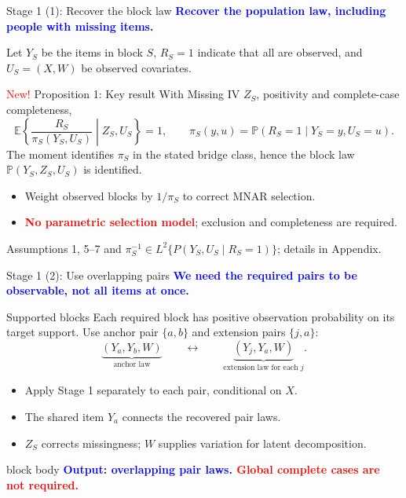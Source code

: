 \documentclass[aspectratio=169,10pt]{beamer}
\newcommand{\slideannotation}{\fontsize{8pt}{9.6pt}\selectfont}
\newcommand{\E}{\mathbb E}
\newcommand{\Prb}{\mathbb P}
\newcommand{\bluekey}[1]{\textcolor{Blue}{\textbf{#1}}}
\newcommand{\redkey}[1]{\textcolor{Red}{\textbf{#1}}}
\newenvironment{takeaway}{%
  \begin{beamercolorbox}[rounded=true,sep=.7em,wd=\linewidth]{block body}%
  \color{Navy}\bfseries}{\end{beamercolorbox}}
\begin{document}
\begin{frame}{Stage 1 (1): Recover the block law}
\bluekey{Recover the population law, including people with missing items.}\par
\smallskip
Let $Y_S$ be the items in block $S$, $R_S=1$ indicate that all are observed,
and $U_S=(X,W)$ be observed covariates.
\begin{block}{\textcolor{Red}{New!} Proposition 1: Key result}
With Missing IV $Z_S$, positivity and complete-case completeness,
\[
\E\left\{\frac{R_S}{\pi_S(Y_S,U_S)}\middle|Z_S,U_S\right\}=1,
\qquad \pi_S(y,u)=\Prb(R_S=1\mid Y_S=y,U_S=u).
\]
The moment identifies $\pi_S$ in the stated bridge class, hence the
block law $\Prb(Y_S,Z_S,U_S)$ is identified.
\end{block}
\begin{itemize}
\item Weight observed blocks by $1/\pi_S$ to correct MNAR selection.
\item \redkey{No parametric selection model}; exclusion and completeness are required.
\end{itemize}
{\slideannotation Assumptions 1, 5--7 and $\pi_S^{-1}\in L^2\{P(Y_S,U_S\mid R_S=1)\}$; details in Appendix.}
\end{frame}

\begin{frame}{Stage 1 (2): Use overlapping pairs}
\bluekey{We need the required pairs to be observable, not all items at once.}
\begin{block}{Supported blocks}
Each required block has positive observation probability on its target support.
Use anchor pair $\{a,b\}$ and extension pairs $\{j,a\}$:
\[
\underbrace{(Y_a,Y_b,W)}_{\text{anchor law}}
\qquad\longleftrightarrow\qquad
\underbrace{(Y_j,Y_a,W)}_{\text{extension law for each }j}.
\]
\end{block}
\begin{itemize}
\item Apply Stage 1 separately to each pair, conditional on $X$.
\item The shared item $Y_a$ connects the recovered pair laws.
\item $Z_S$ corrects missingness; $W$ supplies variation for latent decomposition.
\end{itemize}
\medskip
\begin{takeaway}
\bluekey{Output: overlapping pair laws.}\quad
\redkey{Global complete cases are not required.}
\end{takeaway}
\end{frame}
\end{document}
